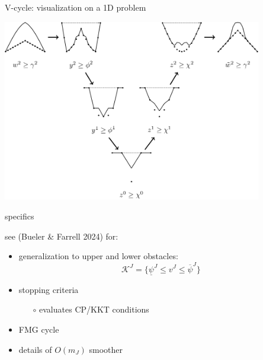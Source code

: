 \documentclass[svgnames,
               hyperref={colorlinks,citecolor=DeepPink4,linkcolor=FireBrick,urlcolor=Maroon},
               usepdftitle=false]  %
               {beamer}
\begin{document}
\begin{frame}{V-cycle: visualization on a 1D problem}

\centering
\includegraphics[width=0.85\textwidth]{../talk-dms/figs/vcycle-visualized.png}
\end{frame}


\begin{frame}{specifics}

see (Bueler \& Farrell 2024) for:
\begin{itemize}
\item generalization to upper and lower obstacles:
    $$\mathcal{K}^J = \{\underline{\psi}^J \le v^J \le \overline{\psi}^J\}$$
\item stopping criteria
    \begin{itemize}
    \item[$\circ$] evaluates CP/KKT conditions
    \end{itemize}
\item FMG cycle
\item details of $O(m_J)$ smoother
\end{itemize}
\end{frame}
\end{document}
